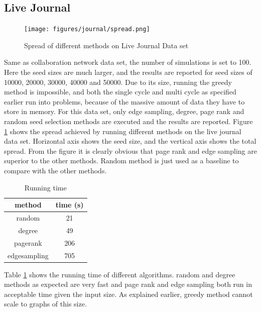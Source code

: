 \documentclass[english]{tktltiki}
\begin{document}
\subsection{Live Journal}

\begin{figure}[ht!]
\centering
\texttt{[image: figures/journal/spread.png]}
\caption{Spread of different methods on Live Journal Data set}
\label{journal:spread}
\end{figure}

Same as collaboration network data set, the number of simulations is set to 100. 
Here the seed sizes are much larger, and the results are reported for seed sizes of 10000, 20000, 30000, 40000 and 50000. 
Due to its size, running the greedy method is impossible, and both the single cycle and multi cycle as specified earlier run into problems, because of the massive amount of data they have to store in memory. 
For this data set, only edge sampling, degree, page rank and random seed selection methods are executed and the results are reported.
Figure \ref{journal:spread} shows the spread achieved by running different methods on the live journal data set. 
Horizontal axis shows the seed size, and the vertical axis shows the total spread. 
From the figure it is clearly obvious that page rank and edge sampling are superior to the other methods. 
Random method is just used as a baseline to compare with the other methods.

\begin{table}[ht!]
\centering
\begin{tabular}{ |c|c| }
\hline 
  method & time (s)\\
  \hline 
  random & 21\\
  degree & 49\\
  pagerank&206\\
  edgesampling&705\\
  \hline 
\end{tabular}
\caption{Running time}
\label{journal:time}
\end{table}

Table \ref{journal:time} shows the running time of different algorithms. 
random and degree methods as expected are very fast and page rank and edge sampling both run in acceptable time given the input size. 
As explained earlier, greedy method cannot scale to graphs of this size. 
\end{document}
